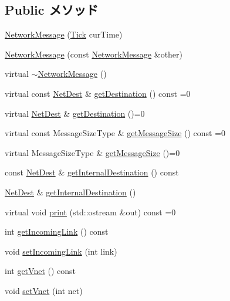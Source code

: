 \subsection*{Public メソッド}
\begin{DoxyCompactItemize}
\item 
\hyperlink{classNetworkMessage_a27c72ea92bff9430ebe2082e620834ab}{NetworkMessage} (\hyperlink{base_2types_8hh_a5c8ed81b7d238c9083e1037ba6d61643}{Tick} curTime)
\item 
\hyperlink{classNetworkMessage_a9cf94db27107f3a20374275c9c9264c9}{NetworkMessage} (const \hyperlink{classNetworkMessage}{NetworkMessage} \&other)
\item 
virtual \hyperlink{classNetworkMessage_a9c8193e762d7e9f7f3f123452ec3ec60}{$\sim$NetworkMessage} ()
\item 
virtual const \hyperlink{classNetDest}{NetDest} \& \hyperlink{classNetworkMessage_a91cc7a52d7587251c22f3927054d6358}{getDestination} () const =0
\item 
virtual \hyperlink{classNetDest}{NetDest} \& \hyperlink{classNetworkMessage_aaa314e104d7c6d36cd953561101bf9d9}{getDestination} ()=0
\item 
virtual const MessageSizeType \& \hyperlink{classNetworkMessage_a105ae7cce3df14eef54796f817f531ca}{getMessageSize} () const =0
\item 
virtual MessageSizeType \& \hyperlink{classNetworkMessage_a0cd5251e519c349113864792294b647a}{getMessageSize} ()=0
\item 
const \hyperlink{classNetDest}{NetDest} \& \hyperlink{classNetworkMessage_accb0c5be7e478affdc09f47a902df0aa}{getInternalDestination} () const 
\item 
\hyperlink{classNetDest}{NetDest} \& \hyperlink{classNetworkMessage_a403e4121cae865e5d3ef72626a0eb41a}{getInternalDestination} ()
\item 
virtual void \hyperlink{classNetworkMessage_a3ea5f7af5db62cc24f4e40df9ea5c971}{print} (std::ostream \&out) const =0
\item 
int \hyperlink{classNetworkMessage_a9fb12de930fd6ddbb84b321a70d5dc6f}{getIncomingLink} () const 
\item 
void \hyperlink{classNetworkMessage_a61dc2149684cb0f99ce3117c2c4c2e5a}{setIncomingLink} (int link)
\item 
int \hyperlink{classNetworkMessage_ab673c798567dd25e7a478ec0574fab4c}{getVnet} () const 
\item 
void \hyperlink{classNetworkMessage_a528d693acf172c3acd1f7fbf73a463f9}{setVnet} (int net)
\end{DoxyCompactItemize}
